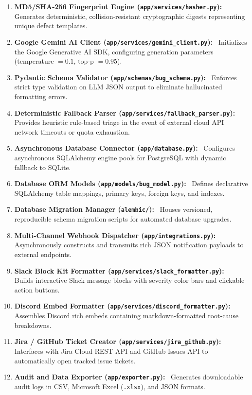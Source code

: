 \documentclass[12pt,a4paper]{article}
\newcommand{\lead}[1]{\textbf{#1}\ }
\begin{document}
\begin{enumerate}[leftmargin=1.5em,itemsep=4pt]
    \item \lead{MD5/SHA-256 Fingerprint Engine (\texttt{app/services/hasher.py}):} Generates deterministic, collision-resistant cryptographic digests representing unique defect templates.
    \item \lead{Google Gemini AI Client (\texttt{app/services/gemini\_client.py}):} Initializes the Google Generative AI SDK, configuring generation parameters (temperature $= 0.1$, top-p $= 0.95$).
    \item \lead{Pydantic Schema Validator (\texttt{app/schemas/bug\_schema.py}):} Enforces strict type validation on LLM JSON output to eliminate hallucinated formatting errors.
    \item \lead{Deterministic Fallback Parser (\texttt{app/services/fallback\_parser.py}):} Provides heuristic rule-based triage in the event of external cloud API network timeouts or quota exhaustion.
    \item \lead{Asynchronous Database Connector (\texttt{app/database.py}):} Configures asynchronous SQLAlchemy engine pools for PostgreSQL with dynamic fallback to SQLite.
    \item \lead{Database ORM Models (\texttt{app/models/bug\_model.py}):} Defines declarative SQLAlchemy table mappings, primary keys, foreign keys, and indexes.
    \item \lead{Database Migration Manager (\texttt{alembic/}):} Houses versioned, reproducible schema migration scripts for automated database upgrades.
    \item \lead{Multi-Channel Webhook Dispatcher (\texttt{app/integrations.py}):} Asynchronously constructs and transmits rich JSON notification payloads to external endpoints.
    \item \lead{Slack Block Kit Formatter (\texttt{app/services/slack\_formatter.py}):} Builds interactive Slack message blocks with severity color bars and clickable action buttons.
    \item \lead{Discord Embed Formatter (\texttt{app/services/discord\_formatter.py}):} Assembles Discord rich embeds containing markdown-formatted root-cause breakdowns.
    \item \lead{Jira / GitHub Ticket Creator (\texttt{app/services/jira\_github.py}):} Interfaces with Jira Cloud REST API and GitHub Issues API to automatically open tracked issue tickets.
    \item \lead{Audit and Data Exporter (\texttt{app/exporter.py}):} Generates downloadable audit logs in CSV, Microsoft Excel (\texttt{.xlsx}), and JSON formats.

\end{enumerate}
\end{document}

